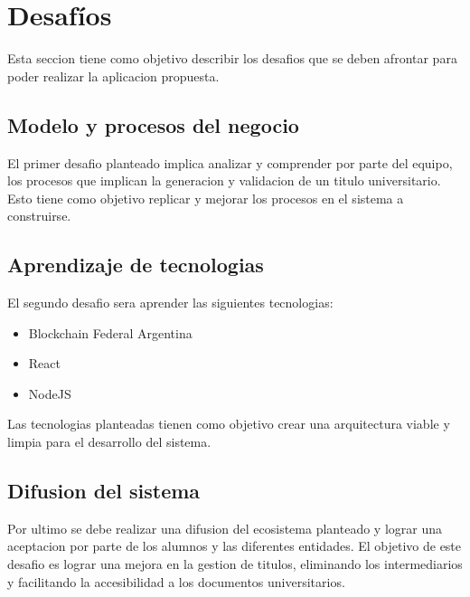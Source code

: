 \documentclass[11pt,a4paper]{article}
\begin{document}
    \section{Desafíos}

        Esta seccion tiene como objetivo describir los desafios que se deben afrontar para poder realizar la aplicacion propuesta.

        \subsection{Modelo y procesos del negocio} 

            El primer desafio planteado implica analizar y comprender por parte del equipo, los procesos que implican la 
            generacion y validacion de un titulo universitario. Esto tiene como objetivo replicar y mejorar los procesos 
            en el sistema a construirse.
        
        \subsection{Aprendizaje de tecnologias} 

            El segundo desafio sera aprender las siguientes tecnologias:
            
            \begin{itemize}
                \item Blockchain Federal Argentina
                \item React
                \item NodeJS
            \end{itemize}
            
            Las tecnologias planteadas tienen como objetivo crear una arquitectura viable y limpia para el desarrollo del sistema.
            
            
        \subsection{Difusion del sistema} 

            Por ultimo se debe realizar una difusion del ecosistema planteado y lograr una aceptacion por parte de los alumnos y las diferentes entidades.
            El objetivo de este desafio es lograr una mejora en la gestion de titulos, eliminando los intermediarios y facilitando la accesibilidad 
            a los documentos universitarios. 
\end{document}

